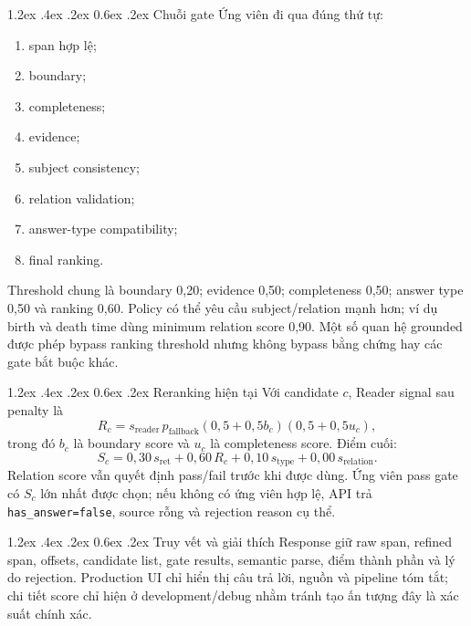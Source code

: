 \documentclass[12pt,a4paper,oneside]{report}
\makeatletter
\renewcommand\section{\@startsection {section}{1}{\z@}%
  {1.2ex \@plus .4ex \@minus .2ex}%
  {0.6ex \@plus .2ex}%
  {\normalfont\Large\bfseries}}
\newcommand{\code}[1]{\texttt{#1}}
\makeatother
\begin{document}
\section{Chuỗi gate}
Ứng viên đi qua đúng thứ tự:
\begin{enumerate}
  \item span hợp lệ;
  \item boundary;
  \item completeness;
  \item evidence;
  \item subject consistency;
  \item relation validation;
  \item answer-type compatibility;
  \item final ranking.
\end{enumerate}
Threshold chung là boundary 0,20; evidence 0,50; completeness 0,50; answer type
0,50 và ranking 0,60. Policy có thể yêu cầu subject/relation mạnh hơn; ví dụ birth và
death time dùng minimum relation score 0,90. Một số quan hệ grounded được phép bypass
ranking threshold nhưng không bypass bằng chứng hay các gate bắt buộc khác.

\section{Reranking hiện tại}
Với candidate $c$, Reader signal sau penalty là
\begin{equation}
  R_c=s_{\mathrm{reader}}\,p_{\mathrm{fallback}}
  \left(0{,}5+0{,}5b_c\right)
  \left(0{,}5+0{,}5u_c\right),
\end{equation}
trong đó $b_c$ là boundary score và $u_c$ là completeness score. Điểm cuối:
\begin{equation}
  S_c=0{,}30\,s_{\mathrm{ret}}+0{,}60\,R_c+
      0{,}10\,s_{\mathrm{type}}+0{,}00\,s_{\mathrm{relation}}.
  \label{eq:ranking}
\end{equation}
Relation score vẫn quyết định pass/fail trước khi  được dùng. Ứng
viên pass gate có $S_c$ lớn nhất được chọn; nếu không có ứng viên hợp lệ, API trả
\code{has\_answer=false}, source rỗng và rejection reason cụ thể.

\section{Truy vết và giải thích}
Response giữ raw span, refined span, offsets, candidate list, gate results, semantic
parse, điểm thành phần và lý do rejection. Production UI chỉ hiển thị câu trả lời,
nguồn và pipeline tóm tắt; chi tiết score chỉ hiện ở development/debug nhằm tránh tạo
ấn tượng đây là xác suất chính xác.
\end{document}
